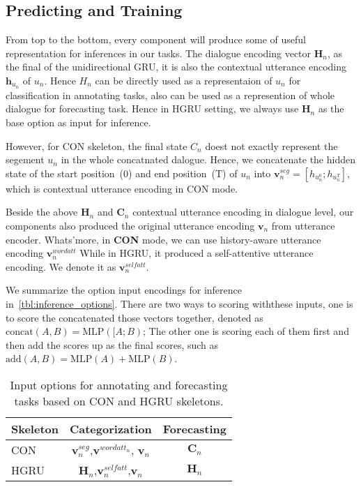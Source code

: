 
\subsection{Predicting and Training}
\label{ssec:inference_and_training}

From top to the bottom, every component will
produce some of useful representation for inferences in our tasks.
The dialogue encoding vector $\bm{H}_{n}$, as the final of the
unidirectional GRU, it is also the contextual utterance encoding
$\bm{h}_{u_{n}}$ of $u_{n}$. Hence $H_{n}$ can be directly used as a
representaion of $u_{n}$ for classification in annotating tasks, also
can be used as a represention of whole dialogue for forecasting
task. Hence in HGRU setting, we always use $\bm{H}_{n}$ as the base
option as input for inference.

However, for CON skeleton, the final state $C_{n}$ doest not exactly
represent the segement $u_{n}$ in the whole concatnated
dalogue. Hence, we concatenate the hidden state of the start
position~(0) and end position~(T) of $u_{n}$ into
$\bm{v}^{seg}_{n}=[h_{u^{0}_{n}};h_{u^{T}_{n}}]$, which is contextual
utterance encoding in CON mode.

Beside the above $\bm{H}_{n}$ and $\bm{C}_{n}$ contextual utterance
encoding in dialogue level, our components also produced the original
utterance encoding $\bm{v}_{n}$ from utterance encoder.  Whats'more,
in \textbf{CON} mode, we can use history-aware utterance encoding $\bm{v}^{wordatt}_{n}$
While in HGRU, it produced a self-attentive utterance encoding. We
denote it as $\bm{v}^{selfatt}_{n}$.

We summarize the option input encodings for inference
in~\autoref{tbl:inference_options}. There are two ways to scoring withthese
inputs, one is to score the concatenated those vectors together,
denoted as $\text{concat}(A, B)=\text{MLP}([A;B)$; The other one is
scoring each of them first and then add the scores up as the final
scores, such as $\text{add}(A,B)=\text{MLP}(A)+\text{MLP}(B)$.


\begin{table}[t]
\caption{\label{tbl:inference_options} Input options for annotating and forecasting tasks based on CON and HGRU skeletons.}
\begin{center}
\setlength{\tabcolsep}{3pt}
\begin{tabular}{lcc}
\toprule
\hline
Skeleton & Categorization & Forecasting  \\ \hline \hline
CON      & $\bm{v}^{seg}_{n}$,$\bm{v}^{{wordatt}_{n}}$, $\bm{v}_{n}$ & $\bm{C}_{n}$ \\ \hline
HGRU     & $\bm{H}_{n}$,$\bm{v}^{selfatt}_{n}$,$\bm{v}_{n}$          & $\bm{H}_{n}$ \\ \hline
\bottomrule
\end{tabular}
\end{center}
\end{table}


